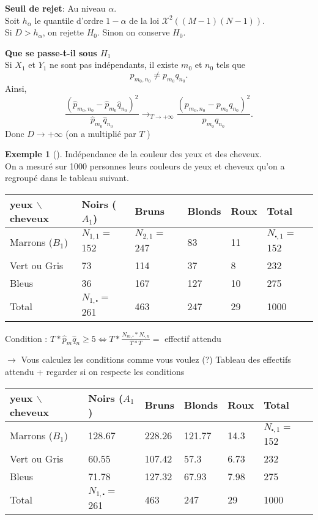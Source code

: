 \documentclass{article}
\theoremstyle{plain}%
\theoremstyle{definition}
\newtheorem{exmp}{Exemple}[section]
\theoremstyle{remark}
\begin{document}
\textbf{Seuil de rejet}: Au niveau $ \alpha  $. \\
Soit $ h_\alpha  $ le quantile d'ordre $ 1-\alpha  $ de la loi $ \mathcal{X}^2((M-1)(N-1)) $. \\ 
Si $ D > h_\alpha  $, on rejette $ H_0 $. Sinon on conserve $ H_0 $. 

\textbf{Que se passe-t-il sous $ H_1 $ } \\
Si $ X_1 $ et $ Y_1 $ ne sont pas indépendants, il existe $ m_0 $ et $ n_0 $ tels que 
\[
    p_{m_0, n_0} \neq p_{m_0}q_{n_0}
.\]
Ainsi, 
\[
    \frac{(\hat{p}_{m_0, n_0} - \hat{p}_{m_0} \hat{q}_{n_0})^2 }{\hat{p}_{m_0} \hat{q}_{n_0}} \to _{T \to +\infty } \frac{(p_{m_0, n_0} - p_{m_0} q_{n_0})^2 }{p_{m_0} q_{n_0}}
.\]
Donc $ D \to + \infty  $ (on a multiplié par $ T $ )

\begin{exmp}[]
    Indépendance de la couleur des yeux et des cheveux.\\
    On a mesuré sur 1000 personnes leurs couleurs de yeux et cheveux qu'on a regroupé dans le tableau suivant.

    \begin{table}[!h]
        \centering
        \begin{tabular}{|l|l|l|l|l|l|}
        \hline
            yeux $ \backslash $  cheveux & Noirs ($A_1$) & Bruns & Blonds & Roux & Total \\ \hline
            Marrons ($B_1$) & $N_{1,1}=$ 152 & $N_{2,1}=$ 247 & 83 & 11 & $N_{\centerdot, 1}=$ 152 \\ \hline
            Vert ou Gris & 73 & 114 & 37 & 8 & 232 \\ \hline
            Bleus & 36 & 167 & 127 & 10 & 275 \\ \hline
            Total & $N_{1,\centerdot}=$ 261 & 463 & 247 & 29 & 1000 \\ \hline
        \end{tabular}
    \end{table}

    Condition : $ T * \hat{p}_m \hat{q}_n \geq 5 \Leftrightarrow T * \frac{N_{m, \centerdot} * N_{\centerdot, n}}{T*T} = $ effectif attendu
    
    $\rightarrow$ Vous calculez les conditions comme vous voulez (?)
    Tableau des effectifs attendu + regarder si on respecte les conditions
    \begin{table}[!h]
        \centering
        \begin{tabular}{|l|l|l|l|l|l|}
        \hline
            yeux $ \backslash $  cheveux & Noirs ($A_1$) & Bruns & Blonds & Roux & Total \\ \hline
            Marrons ($B_1$) & 128.67 & 228.26 & 121.77 & 14.3 & $N_{\centerdot, 1}=$ 152 \\ \hline
            Vert ou Gris & 60.55 & 107.42 & 57.3 & 6.73 & 232 \\ \hline
            Bleus & 71.78 & 127.32 & 67.93 & 7.98 & 275 \\ \hline
            Total & $N_{1,\centerdot}=$ 261 & 463 & 247 & 29 & 1000 \\ \hline
        \end{tabular}
    \end{table}


\end{exmp}
\end{document}
